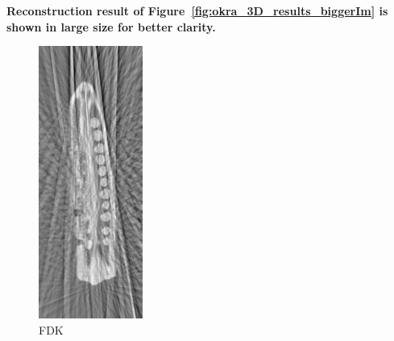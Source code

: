 \documentclass{article}
\begin{document}
\textbf{Reconstruction result of Figure~\ref{fig:okra_3D_results_biggerIm}  is shown in large size for better clarity.}
\begin{figure}[!h]
\centering
       \includegraphics[width=0.5\columnwidth]{../images/okra/fdk_cropped.png}
\captionsetup{labelformat=empty}
        \caption{\large{FDK}}
\end{figure}
\newpage
\end{document}
